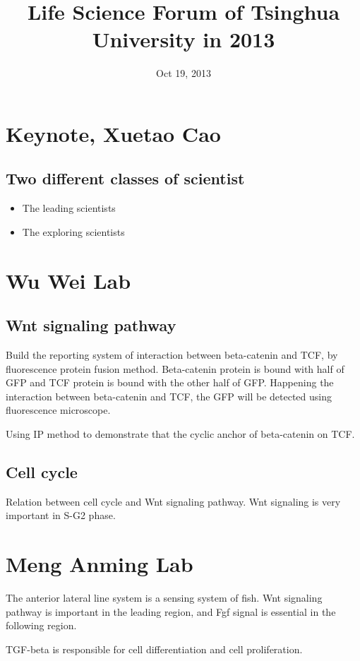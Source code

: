 \documentclass[11pt, oneside]{article}   	%
\title{Life Science Forum of Tsinghua University in 2013}
\date{Oct 19, 2013}
\begin{document}
\maketitle{}

\section{Keynote, Xuetao Cao}
	\subsection{Two different classes of scientist}
		\begin{itemize}
			\item The leading scientists
			\item The exploring scientists
		\end{itemize}
\section{Wu Wei Lab}
	\subsection{Wnt signaling pathway}
		\par
		Build the reporting system of interaction between beta-catenin and TCF, by fluorescence protein fusion method. Beta-catenin protein is bound with half of GFP and TCF protein is bound with the other half of GFP.  Happening the interaction between beta-catenin and TCF, the GFP will be detected using fluorescence microscope.
		\par
		Using IP method to demonstrate that the cyclic anchor of beta-catenin on TCF.
		\par
	\subsection{Cell cycle}
		\par
		Relation between cell cycle and Wnt signaling pathway.
		Wnt signaling is very important in S-G2 phase.
		\par
\section{Meng Anming Lab}
	\par
	The anterior lateral line system is a sensing system of fish. Wnt signaling pathway is important in the leading region, and Fgf signal is essential in the following region.
	\par
	TGF-beta is responsible for cell differentiation and cell proliferation.
	\par
\end{document}
